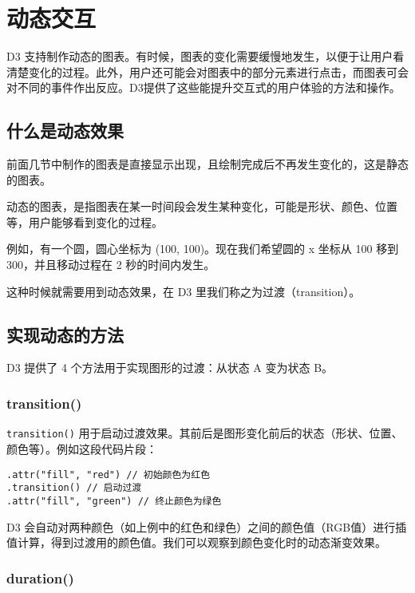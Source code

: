\section{动态交互}

D3 支持制作动态的图表。有时候，图表的变化需要缓慢地发生，以便于让用户看清楚变化的过程。此外，用户还可能会对图表中的部分元素进行点击，而图表可会对不同的事件作出反应。D3提供了这些能提升交互式的用户体验的方法和操作。

\subsection{什么是动态效果}

前面几节中制作的图表是直接显示出现，且绘制完成后不再发生变化的，这是静态的图表。

动态的图表，是指图表在某一时间段会发生某种变化，可能是形状、颜色、位置等，用户能够看到变化的过程。

例如，有一个圆，圆心坐标为 (100, 100)。现在我们希望圆的 x 坐标从 100 移到 300，并且移动过程在 2 秒的时间内发生。

这种时候就需要用到动态效果，在 D3 里我们称之为过渡（transition）。

\subsection{实现动态的方法}

D3 提供了 4 个方法用于实现图形的过渡：从状态 A 变为状态 B。

\subsubsection{transition()}

\verb|transition()| 用于启动过渡效果。其前后是图形变化前后的状态（形状、位置、颜色等）。例如这段代码片段：

\begin{verbatim}
.attr("fill", "red") // 初始颜色为红色
.transition() // 启动过渡
.attr("fill", "green") // 终止颜色为绿色
\end{verbatim}

D3 会自动对两种颜色（如上例中的红色和绿色）之间的颜色值（RGB值）进行插值计算，得到过渡用的颜色值。我们可以观察到颜色变化时的动态渐变效果。

\subsubsection{duration()}

